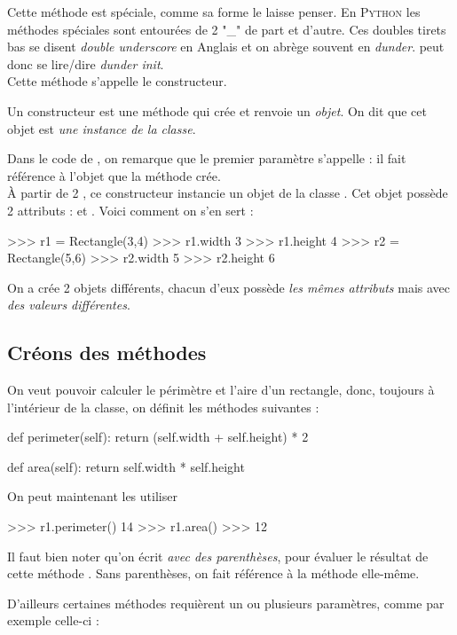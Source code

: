 \documentclass[a4paper,12pt,french]{book}
\begin{document}
    Cette méthode  est spéciale, comme sa forme le laisse penser. En \textsc{Python} les méthodes spéciales sont entourées de 2 "\_" de part et d'autre. Ces \og doubles tirets bas \fg{} se disent \textit{double underscore} en Anglais et on abrège souvent en \textit{dunder}.  peut donc se lire/dire \textit{dunder init}.\\
    Cette méthode s'appelle le constructeur.
    \begin{definition}[ : constructeur]
        Un constructeur est une méthode qui crée et renvoie un \textit{objet}. On dit que cet objet est \textit{une instance de la classe}.
    \end{definition}
    
    Dans le code de , on remarque que le premier paramètre s'appelle  : il fait référence à l'objet que la méthode crée.\\
    À partir de 2 , ce constructeur instancie un objet de la classe . Cet objet possède 2 attributs :  et . Voici comment on s'en sert :
    
    \begin{pythonshell}
>>> r1 = Rectangle(3,4)
>>> r1.width
3
>>> r1.height
4
>>>  r2 = Rectangle(5,6)
>>> r2.width
5
>>> r2.height
6
        \end{pythonshell} 
    On a crée 2 objets différents, chacun d'eux possède \textit{les mêmes attributs} mais avec \textit{des valeurs différentes}.
    
    \subsection{Créons des méthodes}
    
    On veut pouvoir calculer le périmètre et l'aire d'un rectangle, donc, toujours à l'intérieur de la classe, on définit les méthodes suivantes :
    
    \begin{pythoncode}
def perimeter(self):
    return (self.width + self.height) * 2
        
def area(self):
    return self.width * self.height
\end{pythoncode}
    
    
    On peut maintenant les utiliser 
    
    \begin{pythonshell}
>>> r1.perimeter()
14
>>> r1.area()
>>> 12
    \end{pythonshell}
    \begin{remarque}[]
        Il faut bien noter qu'on écrit  \textit{avec des parenthèses}, pour évaluer le résultat de cette méthode . Sans parenthèses, on fait référence à la méthode elle-même.\\
    \end{remarque}
    D'ailleurs certaines méthodes requièrent un ou plusieurs paramètres, comme par exemple celle-ci :
    
\end{document}
